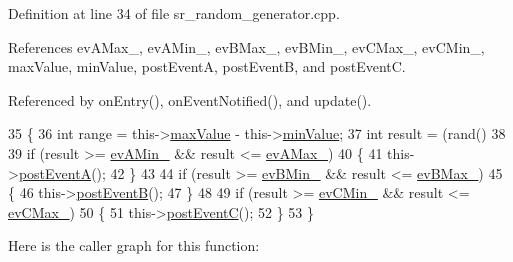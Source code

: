 Definition at line 34 of file sr\+\_\+random\+\_\+generator.\+cpp.



References ev\+A\+Max\+\_\+, ev\+A\+Min\+\_\+, ev\+B\+Max\+\_\+, ev\+B\+Min\+\_\+, ev\+C\+Max\+\_\+, ev\+C\+Min\+\_\+, max\+Value, min\+Value, post\+EventA, post\+EventB, and post\+EventC.



Referenced by on\+Entry(), on\+Event\+Notified(), and update().


\begin{DoxyCode}
35 \{
36     \textcolor{keywordtype}{int} range = this->\hyperlink{classsmacc_1_1state__reactors_1_1SrRandomGenerator_a693a1e627efe396dbb4f2849ce14d85d}{maxValue} - this->\hyperlink{classsmacc_1_1state__reactors_1_1SrRandomGenerator_ab2a695fd1f34b17aff3ab36fb38e3765}{minValue};
37     \textcolor{keywordtype}{int} result = (rand() %
38 
39     \textcolor{keywordflow}{if} (result >= \hyperlink{classsmacc_1_1state__reactors_1_1SrRandomGenerator_aaa18a0eec1d0777ea1607b5ac7491495}{evAMin\_} && result <= \hyperlink{classsmacc_1_1state__reactors_1_1SrRandomGenerator_ad5148909923e6761c7de33749f324609}{evAMax\_})
40     \{
41         this->\hyperlink{classsmacc_1_1state__reactors_1_1SrRandomGenerator_ac157de4b848ebc5da1acb593f7b25108}{postEventA}();
42     \}
43 
44     \textcolor{keywordflow}{if} (result >= \hyperlink{classsmacc_1_1state__reactors_1_1SrRandomGenerator_ae1022906bed4d126b7520f81c3e52976}{evBMin\_} && result <= \hyperlink{classsmacc_1_1state__reactors_1_1SrRandomGenerator_ad4b1ecc14ae3d153e3b1fe5006a8a192}{evBMax\_})
45     \{
46         this->\hyperlink{classsmacc_1_1state__reactors_1_1SrRandomGenerator_a0b38db23bf80e0709c2ae51c6a64ac1c}{postEventB}();
47     \}
48 
49     \textcolor{keywordflow}{if} (result >= \hyperlink{classsmacc_1_1state__reactors_1_1SrRandomGenerator_a048ec99a9978b1d51b8ecb96be4800c8}{evCMin\_} && result <= \hyperlink{classsmacc_1_1state__reactors_1_1SrRandomGenerator_af74df138d11468fd2b1d998698fd9503}{evCMax\_})
50     \{
51         this->\hyperlink{classsmacc_1_1state__reactors_1_1SrRandomGenerator_a1aeb07de7b52a9f5811e5f60444731a0}{postEventC}();
52     \}
53 \}
\end{DoxyCode}
Here is the caller graph for this function\+:
\nopagebreak
